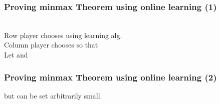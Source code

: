 \documentclass[handout]{beamer}
\begin{document}
\begin{frame}
\frametitle{Proving minmax Theorem using online learning (1)}
~\\
Row player chooses  using learning alg. \\ \pause 
Column player chooses   so that
\R{$\Qt = \arg \maxq \mptq$}
\\ \pause
Let  and
\\ \pause
\R{\em
\[
\begin{array}{rcll}
{\displaystyle{\minp \maxq \trans{\P}\M\Q}} 
 &\leq&
\displaystyle{\maxq \trans{\Pa}\M\Q} & \nextline
\pause
  &=&
\displaystyle{\maxq \frac{1}{T} \sumt \trans{\Pt}\M\Q}
                       &\mbox{\rm by definition of~~\Pa}\nextline
\pause
  &\leq&
\displaystyle{\frac{1}{T} \sumt \maxq \trans{\Pt}\M\Q} &
\end{array}
\]
}
\end{frame}


\begin{frame}
\frametitle{Proving minmax Theorem using online learning (2)}
\R{\em
\[
\begin{array}{rcll}
  &=&
\displaystyle{\frac{1}{T} \sumt \trans{\Pt}\M\Qt}
                       &\mbox{\rm by definition of~~\Qt}\nextline
\pause
  &\leq&
\displaystyle{\minp \frac{1}{T} \sumt \trans{\P}\M\Qt + \delt}
                       &\mbox{\rm by the Corollary} \nextline
\pause
  &=&
\displaystyle{\minp \trans{\P}\M\Qa + \delt}
                       &\mbox{\rm by definition of~~\Qa}\nextline
\pause
  &\leq&
\displaystyle{\maxq \minp \trans{\P}\M\Q + \delt.} &
\end{array}
\]
}
\pause
but \R{$\delt$} can be set arbitrarily small.
\end{frame}

\end{document}
